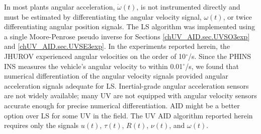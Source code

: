 In most plants angular acceleration, $\dot{\omega}(t)$, is not
instrumented directly and must be estimated by differentiating the
angular velocity signal, $\omega(t)$, or twice differentiating angular
position signals.  
%
The \ac{LS} algorithm was implemented using a single Moore-Penrose
pseudo inverse for Sections \ref{chUV_AID.sec.UVSO3exp} and
\ref{chUV_AID.sec.UVSE3exp}.
%
%
In the experiments reported herein, the \ac{JHUROV} experienced angular
velocities on the order of 10$^\circ$/s.  Since the PHINS \ac{INS}
measures the vehicle's angular velocity to within
0.01$^\circ$/s, we found that numerical differentiation of the angular
velocity signals provided angular acceleration signals adequate for
\ac{LS}.
%
Inertial-grade angular acceleration sensors are not widely available;
many \ac{UV} are not equipped with angular velocity sensors accurate
enough for precise numerical differentiation.
%
\ac{AID} might be a better option over \ac{LS} for some \ac{UV} in the
field.
%
The \ac{UV} \ac{AID} algorithm reported herein
requires only the signals $u(t)$, $\tau(t)$, $R(t)$, $\nu(t)$, and
$\omega(t)$. 
%



%


